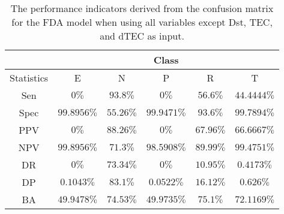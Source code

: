 \begin{table}[!ht]
	\centering
	\begin{tabular}{|c|c|c|c|c|c|}
		\hline
		 & \multicolumn{5}{c|}{Class} \\ \hline
		Statistics & E & N & P & R & T \\ \hline
		Sen & $0\%$ & $93.8\%$ & $0\%$ & $56.6\%$ & $44.4444\%$ \\ \hline
		Spec & $99.8956\%$ & $55.26\%$ & $99.9471\%$ & $93.6\%$ & $99.7894\%$ \\ \hline
		PPV & $0\%$ & $88.26\%$ & $0\%$ & $67.96\%$ & $66.6667\%$ \\ \hline
		NPV & $99.8956\%$ & $71.3\%$ & $98.5908\%$ & $89.99\%$ & $99.4751\%$ \\ \hline
		DR & $0\%$ & $73.34\%$ & $0\%$ & $10.95\%$ & $0.4173\%$ \\ \hline
		DP & $0.1043\%$ & $83.1\%$ & $0.0522\%$ & $16.12\%$ & $0.626\%$ \\ \hline
		BA & $49.9478\%$ & $74.53\%$ & $49.9735\%$ & $75.1\%$ & $72.1169\%$ \\ \hline
	\end{tabular}
	\caption{The performance indicators derived from the confusion matrix for the FDA model when using all variables except Dst, TEC, and dTEC as input.}
	\label{tab:cs:reverse:noTEC:fda}
\end{table}
